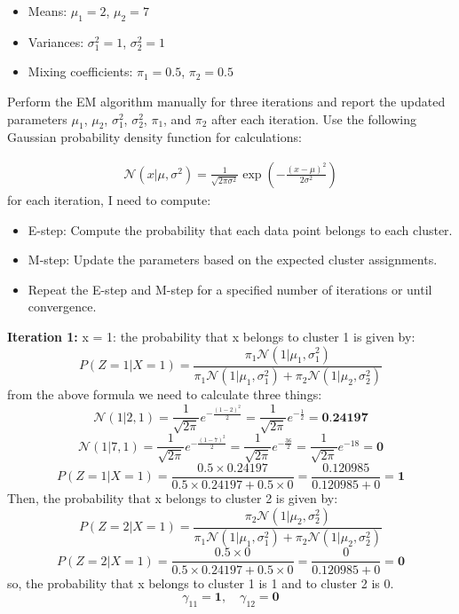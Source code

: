 \documentclass{article}
\begin{document}
\begin{enumerate}
    \begin{itemize}
        \item Means: \(\mu_1 = 2\), \(\mu_2 = 7\)
        \item Variances: \(\sigma_1^2 = 1\), \(\sigma_2^2 = 1\)
        \item Mixing coefficients: \(\pi_1 = 0.5\), \(\pi_2 = 0.5\)
    \end{itemize}

    Perform the EM algorithm manually for three iterations and report the updated parameters \(\mu_1\), \(\mu_2\), \(\sigma_1^2\), \(\sigma_2^2\), \(\pi_1\), and \(\pi_2\) after each iteration. Use the following Gaussian probability density function for calculations:
    
    \begin{align*}
    \mathcal{N}(x | \mu, \sigma^2) = \frac{1}{\sqrt{2 \pi \sigma^2}} \exp\left(-\frac{(x - \mu)^2}{2 \sigma^2}\right)
    \end{align*}
for each iteration, I need to compute:
    \begin{itemize}
        \item E-step: Compute the probability that each data point belongs to each cluster.
        \item M-step: Update the parameters based on the expected cluster assignments.
        \item Repeat the E-step and M-step for a specified number of iterations or until convergence.
    \end{itemize}

    \textbf{Iteration 1:}
x = 1:
the probability that x belongs to cluster 1 is given by:
\[
P(Z = 1 | X = 1) = \frac{\pi_1 \mathcal{N}(1 | \mu_1, \sigma_1^2)}{\pi_1 \mathcal{N}(1 | \mu_1, \sigma_1^2) + \pi_2 \mathcal{N}(1 | \mu_2, \sigma_2^2)}
\]
from the above formula we need to calculate three things:
\[
\mathcal{N}(1 | 2, 1) = \frac{1}{\sqrt{2\pi}} e^{-\frac{(1-2)^2}{2}} = \frac{1}{\sqrt{2\pi}} e^{-\frac{1}{2}} = \textbf{0.24197}
\]
\[
\mathcal{N}(1 | 7, 1) = \frac{1}{\sqrt{2\pi}} e^{-\frac{(1-7)^2}{2}} = \frac{1}{\sqrt{2\pi}} e^{-\frac{36}{2}} = \frac{1}{\sqrt{2\pi}} e^{-18} = \textbf{0}
\]
\[
P(Z = 1 | X = 1) = \frac{0.5 \times 0.24197}{0.5 \times 0.24197 + 0.5 \times 0} = \frac{0.120985}{0.120985 + 0} = \textbf{1}
\]
Then, the probability that x belongs to cluster 2 is given by:
\[
P(Z = 2 | X = 1) = \frac{\pi_2 \mathcal{N}(1 | \mu_2, \sigma_2^2)}{\pi_1 \mathcal{N}(1 | \mu_1, \sigma_1^2) + \pi_2 \mathcal{N}(1 | \mu_2, \sigma_2^2)}
\]
\[
P(Z = 2 | X = 1) = \frac{0.5 \times 0}{0.5 \times 0.24197 + 0.5 \times 0} = \frac{0}{0.120985 + 0} = \textbf{0}
\]
so, the probability that x belongs to cluster 1 is 1 and to cluster 2 is 0.
\[
\gamma_{11}  = \textbf{1}, \quad \gamma_{12}  = \textbf{0}
\]


\end{enumerate}
\end{document}
